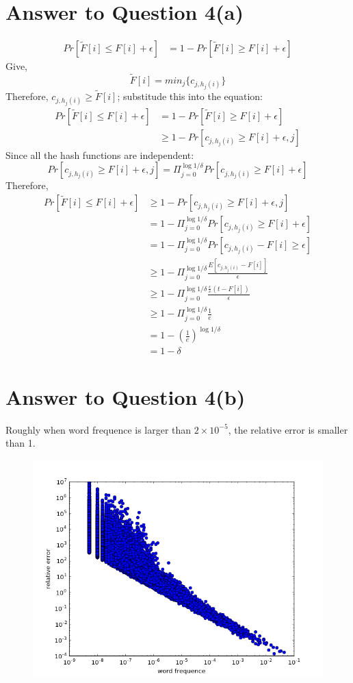 \documentclass[11pt]{article}
\begin{document}
\pagebreak[4]
\section*{Answer to Question 4(a)}
$$
\begin{aligned}
Pr[\tilde{F}[i]\leq F[i] + \epsilon]
& = 1 - Pr[\tilde{F}[i] \geq F[i] + \epsilon]
\end{aligned}
$$
Give,
$$
\tilde{F}[i] = min_j\{c_{j,h_j(i)}\}
$$
Therefore, $c_{j,h_j(i)} \geq \tilde{F}[i]$; substitude this into the equation:
$$
\begin{aligned}
Pr[\tilde{F}[i]\leq F[i] + \epsilon]
& = 1 - Pr[\tilde{F}[i] \geq F[i] + \epsilon] \\
& \geq 1 - Pr[c_{j,h_j(i)} \geq F[i] + \epsilon, j]
\end{aligned}
$$
Since all the hash functions are independent:
$$
Pr[c_{j,h_j(i)} \geq F[i] + \epsilon, j] = \Pi_{j=0}^{\log{1/\delta}}Pr[c_{j,h_j(i)} \geq F[i] + \epsilon]
$$
Therefore,
$$
\begin{aligned}
Pr[\tilde{F}[i]\leq F[i] + \epsilon]
& \geq 1 - Pr[c_{j,h_j(i)} \geq F[i] + \epsilon, j]\\
& = 1 - \Pi_{j=0}^{\log{1/\delta}}Pr[c_{j,h_j(i)} \geq F[i] + \epsilon]\\
& = 1 - \Pi_{j=0}^{\log{1/\delta}}Pr[c_{j,h_j(i)} - F[i] \geq \epsilon]\\
& \geq 1 - \Pi_{j=0}^{\log{1/\delta}}\frac{E[c_{j,h_j(i)} - F[i]]}{\epsilon}\\
& \geq 1 - \Pi_{j=0}^{\log{1/\delta}}\frac{\frac{\epsilon}{e}(t-F[i])}{\epsilon}\\
& \geq 1 - \Pi_{j=0}^{\log{1/\delta}}\frac{1}{e}\\
& = 1 - (\frac{1}{e})^{\log{1/\delta}}\\
& = 1 - \delta
\end{aligned}
$$

\pagebreak[4]
\section*{Answer to Question 4(b)}
Roughly when word frequence is larger than $2 \times 10^{-5}$, the relative error is smaller than 1.
\begin{figure}[h]
\center
\includegraphics[scale=0.5]{streaming.png}
\end{figure}
\end{document}
